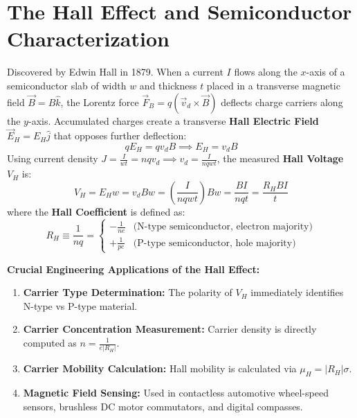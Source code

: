 \section{The Hall Effect and Semiconductor Characterization}
Discovered by Edwin Hall in 1879. When a current $I$ flows along the $x$-axis of a semiconductor slab of width $w$ and thickness $t$ placed in a transverse magnetic field $\vec{B} = B\hat{k}$, the Lorentz force $\vec{F}_B = q(\vec{v}_d \times \vec{B})$ deflects charge carriers along the $y$-axis.
Accumulated charges create a transverse \textbf{Hall Electric Field} $\vec{E}_H = E_H \hat{j}$ that opposes further deflection:
\begin{equation}
q E_H = q v_d B \implies E_H = v_d B
\end{equation}
Using current density $J = \frac{I}{w t} = n q v_d \implies v_d = \frac{I}{n q w t}$, the measured \textbf{Hall Voltage} $V_H$ is:
\begin{equation}
V_H = E_H w = v_d B w = \left(\frac{I}{n q w t}\right) B w = \frac{B I}{n q t} = \frac{R_H B I}{t}
\end{equation}
where the \textbf{Hall Coefficient} is defined as:
\begin{equation}
R_H \equiv \frac{1}{n q} = \begin{cases} -\frac{1}{n e} & \text{(N-type semiconductor, electron majority)} \\ +\frac{1}{p e} & \text{(P-type semiconductor, hole majority)} \end{cases}
\end{equation}

\begin{takeawaybox}
\textbf{Crucial Engineering Applications of the Hall Effect:}
\begin{enumerate}[itemsep=2pt]
    \item \textbf{Carrier Type Determination:} The polarity of $V_H$ immediately identifies N-type vs P-type material.
    \item \textbf{Carrier Concentration Measurement:} Carrier density is directly computed as $n = \frac{1}{e |R_H|}$.
    \item \textbf{Carrier Mobility Calculation:} Hall mobility is calculated via $\mu_H = |R_H| \sigma$.
    \item \textbf{Magnetic Field Sensing:} Used in contactless automotive wheel-speed sensors, brushless DC motor commutators, and digital compasses.
\end{enumerate}
\end{takeawaybox}

